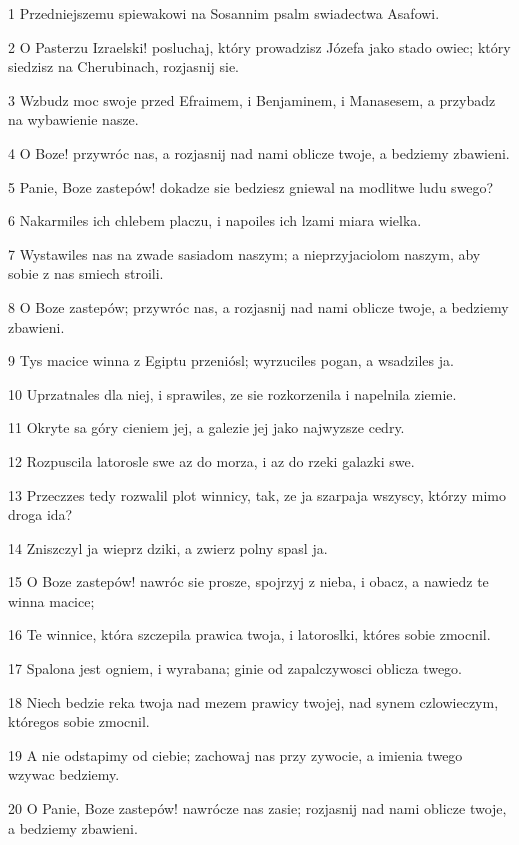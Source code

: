 \par 1 Przedniejszemu spiewakowi na Sosannim psalm swiadectwa Asafowi.
\par 2 O Pasterzu Izraelski! posluchaj, który prowadzisz Józefa jako stado owiec; który siedzisz na Cherubinach, rozjasnij sie.
\par 3 Wzbudz moc swoje przed Efraimem, i Benjaminem, i Manasesem, a przybadz na wybawienie nasze.
\par 4 O Boze! przywróc nas, a rozjasnij nad nami oblicze twoje, a bedziemy zbawieni.
\par 5 Panie, Boze zastepów! dokadze sie bedziesz gniewal na modlitwe ludu swego?
\par 6 Nakarmiles ich chlebem placzu, i napoiles ich lzami miara wielka.
\par 7 Wystawiles nas na zwade sasiadom naszym; a nieprzyjaciolom naszym, aby sobie z nas smiech stroili.
\par 8 O Boze zastepów; przywróc nas, a rozjasnij nad nami oblicze twoje, a bedziemy zbawieni.
\par 9 Tys macice winna z Egiptu przeniósl; wyrzuciles pogan, a wsadziles ja.
\par 10 Uprzatnales dla niej, i sprawiles, ze sie rozkorzenila i napelnila ziemie.
\par 11 Okryte sa góry cieniem jej, a galezie jej jako najwyzsze cedry.
\par 12 Rozpuscila latorosle swe az do morza, i az do rzeki galazki swe.
\par 13 Przeczzes tedy rozwalil plot winnicy, tak, ze ja szarpaja wszyscy, którzy mimo droga ida?
\par 14 Zniszczyl ja wieprz dziki, a zwierz polny spasl ja.
\par 15 O Boze zastepów! nawróc sie prosze, spojrzyj z nieba, i obacz, a nawiedz te winna macice;
\par 16 Te winnice, która szczepila prawica twoja, i latoroslki, któres sobie zmocnil.
\par 17 Spalona jest ogniem, i wyrabana; ginie od zapalczywosci oblicza twego.
\par 18 Niech bedzie reka twoja nad mezem prawicy twojej, nad synem czlowieczym, któregos sobie zmocnil.
\par 19 A nie odstapimy od ciebie; zachowaj nas przy zywocie, a imienia twego wzywac bedziemy.
\par 20 O Panie, Boze zastepów! nawrócze nas zasie; rozjasnij nad nami oblicze twoje, a bedziemy zbawieni.

